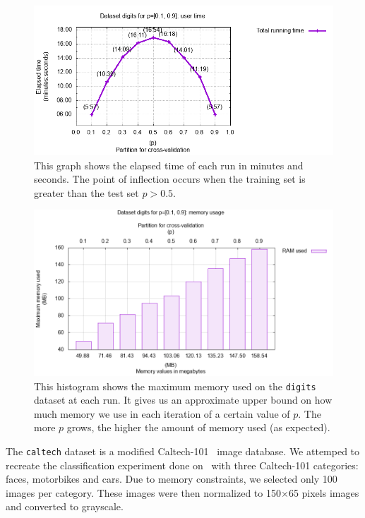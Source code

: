 \documentclass{amsart}
\theoremstyle{plain}
\numberwithin{equation}{section}
\newcommand{\code}[1]{\lstinline[mathescape=true]{#1}}
\begin{document}
\begin{figure}[p]
  \centering\includegraphics[scale=0.6]{imgs/digits_time.png}
  \captionsetup{singlelinecheck=false,justification=justified,margin=0cm}
  \caption{This graph shows the elapsed time of each run in minutes and seconds. The point of
  inflection occurs when the training set is greater than the test set
  $p>0.5$.}\label{fig:digits-time}
\end{figure}

\begin{figure}[t]
  \centering\includegraphics[scale=0.5]{imgs/digits_mem.png}
  \captionsetup{singlelinecheck=false,justification=justified,margin=0cm}
  \caption{This histogram shows the maximum memory used on the \code{digits} dataset at each run.
  It gives us an approximate upper bound on how much memory we use in each iteration of a certain
  value of $p$. The more $p$ grows, the higher the amount of memory used (as
  expected).}\label{fig:digits-mem}
\end{figure}
\newpage
The \code{caltech} dataset is a modified Caltech-101~\cite{caltech101} image database. We attemped
to recreate the classification experiment done on~\cite{poon-domingos} with three Caltech-101
categories: faces, motorbikes and cars. Due to memory constraints, we selected only 100 images per
category. These images were then normalized to 150$\times$65 pixels images and converted to
grayscale.
\end{document}
